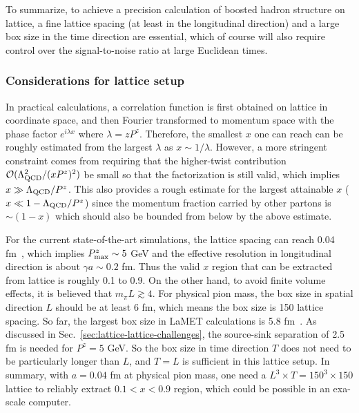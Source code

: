 To summarize, to achieve a precision calculation of boosted hadron structure on lattice, a fine lattice spacing (at least in the longitudinal direction) and a large box size in the time direction are essential, which of course will also require control over the signal-to-noise ratio at large Euclidean times.

\subsubsection{Considerations for lattice setup}
\label{sec:lattice-lattice-special}


In practical calculations, a correlation function is first obtained on lattice in coordinate space, and then Fourier transformed to momentum space with the phase factor $e^{i\lambda x}$ where $\lambda=zP^z$.
Therefore, the smallest $x$ one can reach can be roughly estimated from the largest $\lambda$ as $x\sim 1/\lambda$.
%
However, a more stringent constraint comes from requiring that the higher-twist contribution ${\cal O}(\Lambda_{\rm QCD}^2/(xP^z)^2)$ be small so that the factorization is still valid, which implies $x\gg \Lambda_{\rm QCD}/P^z$.
%
This also provides a rough estimate for the largest attainable $x$ ($x\ll 1-\Lambda_{\rm QCD}/P^z$) since the momentum fraction carried by other partons is $\sim (1-x)$ which should also be bounded from below by the above estimate.


For the current state-of-the-art simulations, the lattice spacing can reach 0.04 fm~\cite{Fan:2020nzz,Gao:2020ito}, which implies $P^z_{\rm max}\sim 5$ GeV and the effective resolution in longitudinal direction is about $\gamma a\sim 0.2$ fm.
%
Thus the valid $x$ region that can be extracted from lattice is roughly 0.1 to 0.9.
%
On the other hand, to avoid finite volume effects, it is believed that $m_\pi L\gtrsim 4$.
%
For physical pion mass, the box size in spatial direction $L$ should be at least 6 fm, which means the box size is 150 lattice spacing. So far, the largest box size in LaMET calculations is 5.8 fm~\cite{Lin:2018qky}.
%
As discussed in Sec.~\ref{sec:lattice-lattice-challenges}, the source-sink separation of 2.5 fm is needed for $P^z=5$ GeV.
%
So the box size in time direction $T$ does not need to be particularly longer than $L$, and $T=L$ is sufficient in this lattice setup.
%
In summary, with $a=0.04$ fm at physical pion mass, one need a
$L^3\times T=150^3\times 150$ lattice to reliably extract $0.1<x<0.9$ region, which
could be possible in an exa-scale computer.

